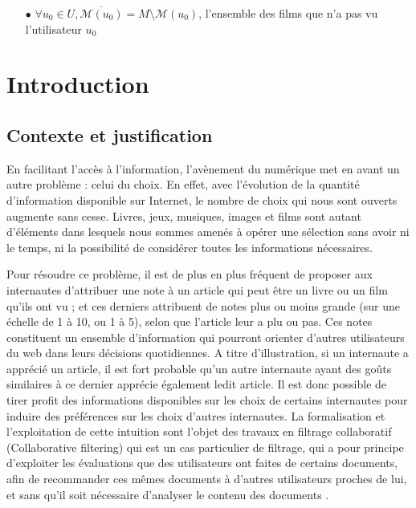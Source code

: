 \documentclass[a4paper, 11pt]{book}
\begin{document}
\medskip

\begin{itemize}
\item[$\bullet$]  $\forall u_0 \in U, \overline{\mathcal{M}(u_0)} = M \setminus \mathcal{M}(u_0)$, l'ensemble des films que n'a pas vu l'utilisateur $u_0$
\end{itemize}

\chapter{Introduction}

\section{Contexte et justification}

En facilitant l'accès à l'information, l'avènement du numérique met en avant un autre problème : celui du choix. En effet, avec l'évolution de la quantité d'information disponible sur Internet, le nombre de choix qui nous sont ouverts augmente sans cesse. Livres, jeux, musiques, images et films sont autant d'éléments dans lesquels nous sommes amenés à opérer une sélection sans avoir ni le temps, ni la possibilité de considérer toutes les informations nécessaires. 

Pour résoudre ce problème, il est de plus en plus fréquent de proposer aux internautes d'attribuer une note à un article qui peut être un livre ou un film qu'ils ont vu ; et ces derniers attribuent de notes plus ou moins grande (sur une échelle de 1 à 10, ou 1 à 5), selon que l'article leur a plu ou pas. Ces notes constituent un ensemble d'information qui pourront orienter d'autres utilisateurs du web dans leurs décisions quotidiennes. A titre d'illustration, si un internaute a apprécié un article, il est fort probable qu'un autre internaute ayant des goûts similaires à ce dernier apprécie également ledit article. Il est donc possible de tirer profit des informations disponibles sur les choix de certains internautes pour induire des préférences sur les choix d'autres internautes. La formalisation et l'exploitation de cette intuition sont l'objet des travaux en filtrage collaboratif (Collaborative filtering) qui est un cas particulier de filtrage, qui a pour principe d'exploiter les évaluations que des utilisateurs ont faites de certains documents, afin de recommander ces mêmes documents à d'autres utilisateurs proches de lui, et sans qu'il soit nécessaire d'analyser le contenu des documents \cite{nguyen}.
\end{document}
